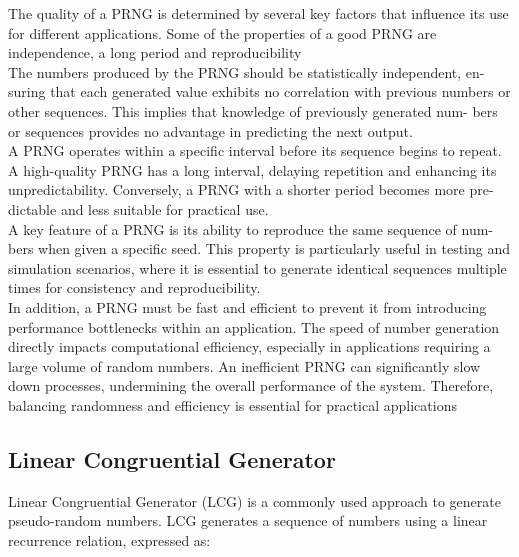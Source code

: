 The quality of a PRNG is determined by several key factors that influence its
use for different applications. Some of the properties of a good PRNG are independence, a long period and reproducibility
\newline \\
The numbers produced by the PRNG should be statistically independent, en-
suring that each generated value exhibits no correlation with previous numbers
or other sequences. This implies that knowledge of previously generated num-
bers or sequences provides no advantage in predicting the next output.
\newline \\
A PRNG operates within a specific interval before its sequence begins to repeat.
A high-quality PRNG has a long interval, delaying repetition and enhancing its
unpredictability. Conversely, a PRNG with a shorter period becomes more pre-
dictable and less suitable for practical use.
\newline \\
A key feature of a PRNG is its ability to reproduce the same sequence of num-
bers when given a specific seed. This property is particularly useful in testing
and simulation scenarios, where it is essential to generate identical sequences
multiple times for consistency and reproducibility.
\newline \\
In addition, a PRNG must be fast and efficient to prevent it from introducing
performance bottlenecks within an application. The speed of number generation
directly impacts computational efficiency, especially in applications requiring a
large volume of random numbers. An inefficient PRNG can significantly slow
down processes, undermining the overall performance of the system. Therefore,
balancing randomness and efficiency is essential for practical applications

\subsection{Linear Congruential Generator}

Linear Congruential Generator (LCG) is a commonly used approach to generate
pseudo-random numbers. LCG generates a sequence of numbers using a linear
recurrence relation, expressed as:

